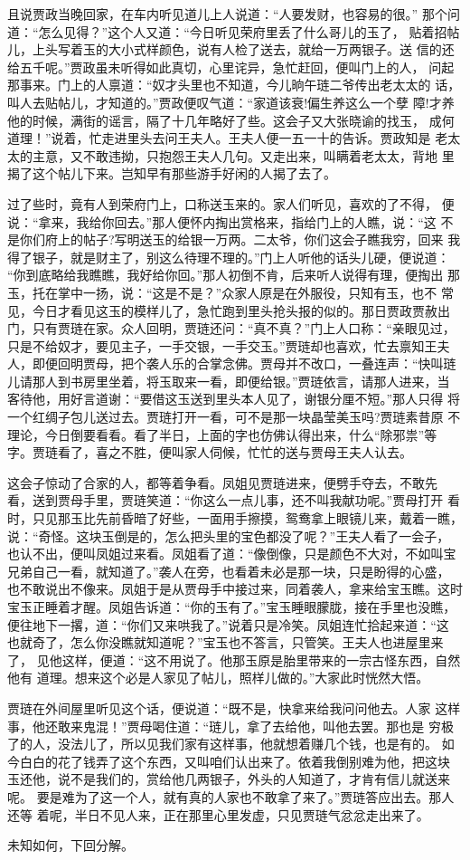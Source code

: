 且说贾政当晚回家，在车内听见道儿上人说道：“人要发财，也容易的很。”
那个问道：“怎么见得？”这个人又道：“今日听见荣府里丢了什么哥儿的玉了，
贴着招帖儿，上头写着玉的大小式样颜色，说有人检了送去，就给一万两银子。送
信的还给五千呢。”贾政虽未听得如此真切，心里诧异，急忙赶回，便叫门上的人，
问起那事来。门上的人禀道：“奴才头里也不知道，今儿晌午琏二爷传出老太太的
话，叫人去贴帖儿，才知道的。”贾政便叹气道：“家道该衰!偏生养这么一个孽
障!才养他的时候，满街的谣言，隔了十几年略好了些。这会子又大张晓谕的找玉，
成何道理！”说着，忙走进里头去问王夫人。王夫人便一五一十的告诉。贾政知是
老太太的主意，又不敢违拗，只抱怨王夫人几句。又走出来，叫瞒着老太太，背地
里揭了这个帖儿下来。岂知早有那些游手好闲的人揭了去了。

过了些时，竟有人到荣府门上，口称送玉来的。家人们听见，喜欢的了不得，
便说：“拿来，我给你回去。”那人便怀内掏出赏格来，指给门上的人瞧，说：“这
不是你们府上的帖子?写明送玉的给银一万两。二太爷，你们这会子瞧我穷，回来
我得了银子，就是财主了，别这么待理不理的。”门上人听他的话头儿硬，便说道：
“你到底略给我瞧瞧，我好给你回。”那人初倒不肯，后来听人说得有理，便掏出
那玉，托在掌中一扬，说：“这是不是？”众家人原是在外服役，只知有玉，也不
常见，今日才看见这玉的模样儿了，急忙跑到里头抢头报的似的。那日贾政贾赦出
门，只有贾琏在家。众人回明，贾琏还问：“真不真？”门上人口称：“亲眼见过，
只是不给奴才，要见主子，一手交银，一手交玉。”贾琏却也喜欢，忙去禀知王夫
人，即便回明贾母，把个袭人乐的合掌念佛。贾母并不改口，一叠连声：“快叫琏
儿请那人到书房里坐着，将玉取来一看，即便给银。”贾琏依言，请那人进来，当
客待他，用好言道谢：“要借这玉送到里头本人见了，谢银分厘不短。”那人只得
将一个红绸子包儿送过去。贾琏打开一看，可不是那一块晶莹美玉吗?贾琏素昔原
不理论，今日倒要看看。看了半日，上面的字也仿佛认得出来，什么“除邪祟”等
字。贾琏看了，喜之不胜，便叫家人伺候，忙忙的送与贾母王夫人认去。

这会子惊动了合家的人，都等着争看。凤姐见贾琏进来，便劈手夺去，不敢先
看，送到贾母手里，贾琏笑道：“你这么一点儿事，还不叫我献功呢。”贾母打开
看时，只见那玉比先前昏暗了好些，一面用手擦摸，鸳鸯拿上眼镜儿来，戴着一瞧，
说：“奇怪。这块玉倒是的，怎么把头里的宝色都没了呢？”王夫人看了一会子，
也认不出，便叫凤姐过来看。凤姐看了道：“像倒像，只是颜色不大对，不如叫宝
兄弟自己一看，就知道了。”袭人在旁，也看着未必是那一块，只是盼得的心盛，
也不敢说出不像来。凤姐于是从贾母手中接过来，同着袭人，拿来给宝玉瞧。这时
宝玉正睡着才醒。凤姐告诉道：“你的玉有了。”宝玉睡眼朦胧，接在手里也没瞧，
便往地下一撂，道：“你们又来哄我了。”说着只是冷笑。凤姐连忙拾起来道：“这
也就奇了，怎么你没瞧就知道呢？”宝玉也不答言，只管笑。王夫人也进屋里来了，
见他这样，便道：“这不用说了。他那玉原是胎里带来的一宗古怪东西，自然他有
道理。想来这个必是人家见了帖儿，照样儿做的。”大家此时恍然大悟。

贾琏在外间屋里听见这个话，便说道：“既不是，快拿来给我问问他去。人家
这样事，他还敢来鬼混！”贾母喝住道：“琏儿，拿了去给他，叫他去罢。那也是
穷极了的人，没法儿了，所以见我们家有这样事，他就想着赚几个钱，也是有的。
如今白白的花了钱弄了这个东西，又叫咱们认出来了。依着我倒别难为他，把这块
玉还他，说不是我们的，赏给他几两银子，外头的人知道了，才肯有信儿就送来呢。
要是难为了这一个人，就有真的人家也不敢拿了来了。”贾琏答应出去。那人还等
着呢，半日不见人来，正在那里心里发虚，只见贾琏气忿忿走出来了。

未知如何，下回分解。